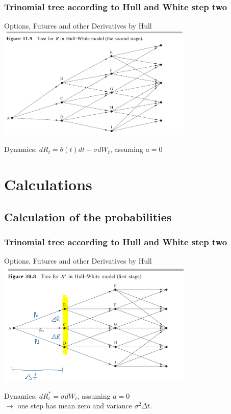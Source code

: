 \documentclass{beamer}
\begin{document}
	
	\begin{frame}
		\frametitle{Trinomial tree according to Hull and White step two}
		\begin{block}{Options, Futures and other Derivatives by Hull}
			\includegraphics[width=0.7\textwidth]{Trinomialbaum hull White step two}
		\end{block}
		Dynamics: $dR_t = \theta(t)dt + \sigma dW_t$, assuming $a=0$
	\end{frame}
	
	
	
	\section{Calculations}
	
	\subsection{Calculation of the probabilities}
	
	\begin{frame}
		\frametitle{Trinomial tree according to Hull and White step two}
		\begin{block}{Options, Futures and other Derivatives by Hull}
			\includegraphics[width=0.7\textwidth]{Trinomialbaum hull White step one Niklas.png}
		\end{block}
		Dynamics: $dR^*_t = \sigma dW_t$, assuming $a=0$\\
		$\rightarrow$ one step has mean zero and variance $\sigma^2\Delta t$.
	\end{frame}
	
\end{document}
